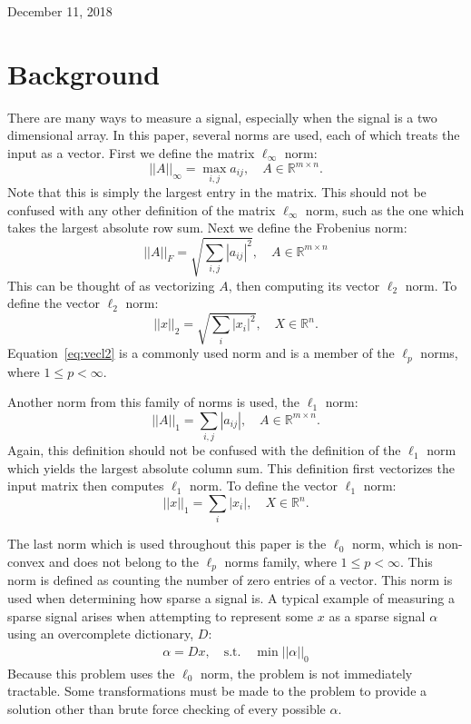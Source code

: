 \documentclass[journal]{IEEEtran}
\begin{document}
\hfill December 11, 2018
\section{Background}
There are many ways to measure a signal, especially when the signal is a two dimensional array. In this
paper, several norms are used, each of which treats the input as a vector. First we define the matrix $\ell_\infty$ norm:
\begin{equation}
||A||_\infty = \max_{i,j} a_{ij}, \quad A \in \mathbb{R}^{m\times n}.
\label{eq:linfty}
\end{equation}
Note that this is simply the largest entry in the matrix. This should not be confused with any other definition of the matrix $\ell_\infty$ norm, such as the one which takes
the largest absolute row sum. Next we define the Frobenius norm:
\begin{equation}
||A||_F = \sqrt{\sum_{i,j} |a_{ij}|^2}, \quad A \in \mathbb{R}^{m\times n}
\label{eq:frob}
\end{equation}
This can be thought of as vectorizing $A$, then computing its vector $\ell_2$ norm.  To define the vector 
$\ell_2$ norm:
\begin{equation}
||x||_2 = \sqrt{\sum_{i} |x_{i}|^2}, \quad X \in \mathbb{R}^{n}.
\label{eq:vecl2}
\end{equation}
Equation~\ref{eq:vecl2} is a commonly used norm and is a member of the $\ell_p$ norms,  where $1\leq p < \infty$. 

Another norm from this family of norms is used, the $\ell_1$ norm:
\begin{equation}
||A||_1 = \sum_{i,j} |a_{ij}|, \quad A \in \mathbb{R}^{m\times n}.
\label{eq:l1}
\end{equation}
Again, this definition should not be confused with the definition of the $\ell_1$ norm which yields the largest absolute column sum. This definition first vectorizes the input matrix then computes $\ell_1$
norm. To define the vector $\ell_1$ norm:
\begin{equation}
||x||_1 = \sum_{i} |x_{i}|, \quad X \in \mathbb{R}^{n}.
\label{eq:vecl1}
\end{equation}

The last norm which is used throughout this paper is the $\ell_0$ norm, which is non-convex and does not belong to the  $\ell_p$ norms family, where $1\leq p < \infty$.  This 
norm is defined as counting the number of zero entries of a vector. This norm is used when determining
how sparse a signal is. 
A typical example of measuring a sparse signal arises when attempting to represent some $x$ 
as a sparse signal $\alpha$ using an overcomplete dictionary, $D$:
\begin{align}
\alpha = Dx, \quad \mathrm{s.t.} \quad \min ||\alpha||_0
\label{eq:sparseproblem}
\end{align}
Because this problem uses the $\ell_0$ norm, the problem is not immediately tractable. Some transformations
must be made to the problem to provide a solution other than brute force checking of every possible
$\alpha$. 
\end{document}
